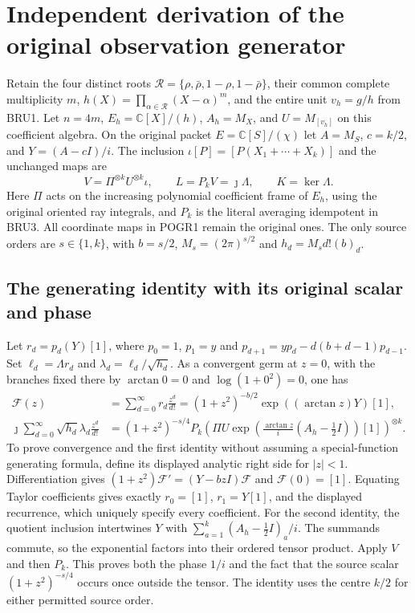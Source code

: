 \section{Independent derivation of the original observation generator}
\label{sec:POGR}

Retain the four distinct roots $\mathcal R=\{\rho,\bar\rho,
1-\rho,1-\bar\rho\}$, their common complete multiplicity $m$,
$h(X)=\prod_{\alpha\in\mathcal R}(X-\alpha)^m$, and the entire unit
$v_h=g/h$ from BRU1. Let $n=4m$, $E_h=\mathbb C[X]/(h)$,
$A_h=M_X$, and $U=M_{[v_h]}$ on this coefficient algebra. On the
original packet $E=\mathbb C[S]/(\chi)$ let $A=M_S$,
$c=k/2$, and $Y=(A-cI)/i$. The inclusion
$\iota[P]=[P(X_1+\cdots+X_k)]$ and the unchanged maps are
\[
 V=\Pi^{\otimes k}U^{\otimes k}\iota,
 \qquad L=P_kV=\jmath\Lambda,
 \qquad K=\ker\Lambda.
 \tag{POGR1}
\]
Here $\Pi$ acts on the increasing polynomial coefficient frame of
$E_h$, using the original oriented ray integrals, and $P_k$ is the
literal averaging idempotent in BRU3. All coordinate maps in POGR1
remain the original ones. The only source orders are $s\in\{1,k\}$,
with $b=s/2$, $M_s=(2\pi)^{s/2}$ and $h_d=M_s d!(b)_d$.

\subsection{The generating identity with its original scalar and phase}
Let $r_d=p_d(Y)[1]$, where
$p_0=1$, $p_1=y$ and
$p_{d+1}=yp_d-d(b+d-1)p_{d-1}$. Set
$\ell_d=\Lambda r_d$ and $\lambda_d=\ell_d/\sqrt{h_d}$.
As a convergent germ at $z=0$, with the branches fixed there by
$\arctan 0=0$ and $\log(1+0^2)=0$, one has
\[
 \begin{split}
 \mathcal F(z)&=\sum_{d=0}^\infty r_d\frac{z^d}{d!}
   =(1+z^2)^{-b/2}\exp((\arctan z)Y)[1],\\
 \jmath\sum_{d=0}^\infty\sqrt{h_d}\lambda_d\frac{z^d}{d!}
   &=(1+z^2)^{-s/4}P_k
    \left(\Pi U\exp\left(\frac{\arctan z}{i}
                         (A_h-\tfrac12 I)\right)[1]\right)^{\otimes k}.
 \end{split}\tag{POGR2}
\]
To prove convergence and the first identity without assuming a
special-function generating formula, define its displayed analytic
right side for $|z|<1$. Differentiation gives
$(1+z^2)\mathcal F'=(Y-bzI)\mathcal F$ and
$\mathcal F(0)=[1]$. Equating Taylor coefficients gives exactly
$r_0=[1]$, $r_1=Y[1]$, and the displayed recurrence, which uniquely
specify every coefficient. For the second identity, the quotient
inclusion intertwines $Y$ with
$\sum_{a=1}^k(A_h-\tfrac12 I)_a/i$. The summands commute, so the
exponential factors into their ordered tensor product. Apply $V$
and then $P_k$. This proves both the phase $1/i$ and the fact that
the source scalar $(1+z^2)^{-s/4}$ occurs once outside the tensor.
The identity uses the centre $k/2$ for either permitted source order.

